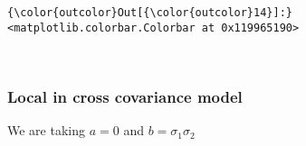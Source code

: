 \documentclass[11pt]{article}
\begin{document}
            \begin{Verbatim}[commandchars=\\\{\}]
{\color{outcolor}Out[{\color{outcolor}14}]:} <matplotlib.colorbar.Colorbar at 0x119965190>
\end{Verbatim}
        
    \begin{center}
    \end{center}
    { \hspace*{\fill} \\}
    
    \subsubsection{Local in cross covariance
model}\label{local-in-cross-covariance-model}

We are taking \(a = 0\) and \(b = \sigma_1 \sigma_2\)
\end{document}
